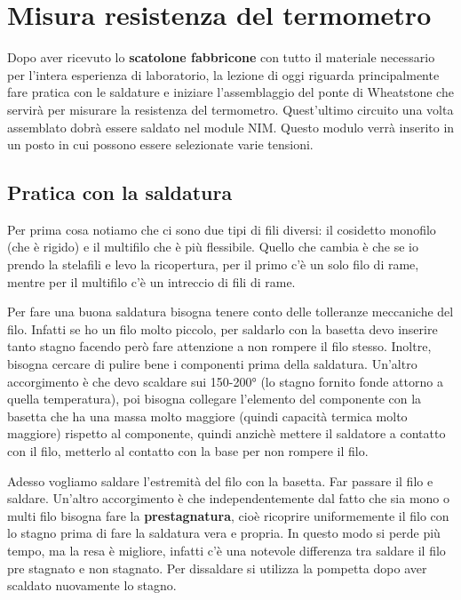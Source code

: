 \documentclass[../main/main.tex]{subfiles}
\begin{document}
\chapter{Misura resistenza del termometro}

Dopo aver ricevuto lo \textbf{scatolone fabbricone} con tutto il materiale necessario per l'intera esperienza di laboratorio, la lezione di oggi riguarda principalmente fare pratica con le saldature e iniziare l'assemblaggio del ponte di Wheatstone che servirà per misurare la resistenza del termometro. Quest'ultimo circuito una volta assemblato dobrà essere saldato nel module NIM. Questo modulo verrà inserito in un posto in cui possono essere selezionate varie tensioni.


\section{Pratica con la saldatura}

Per prima cosa notiamo che ci sono due tipi di fili diversi: il cosidetto monofilo (che è rigido) e il multifilo che è più flessibile. Quello che cambia è che se io prendo la stelafili e levo la ricopertura, per il primo c'è un solo filo di rame, mentre per il multifilo c'è un intreccio di fili di rame.

Per fare una buona saldatura bisogna tenere conto delle tolleranze meccaniche del filo. Infatti se ho un filo molto piccolo, per saldarlo con la basetta devo inserire tanto stagno facendo però fare attenzione a non rompere il filo stesso. Inoltre, bisogna cercare di pulire bene i componenti prima della saldatura.
Un'altro accorgimento è che devo scaldare sui 150-200° (lo stagno fornito fonde attorno a quella temperatura), poi bisogna collegare l'elemento del componente con la basetta che ha una massa molto maggiore (quindi capacità termica molto maggiore) rispetto al componente, quindi anzichè mettere il saldatore a contatto con il filo, metterlo al contatto con la base per non rompere il filo.


Adesso vogliamo saldare l'estremità del filo con la basetta. Far passare il filo e saldare. Un'altro accorgimento è che independentemente dal fatto che sia mono o multi filo bisogna fare la \textbf{prestagnatura}, cioè ricoprire uniformemente il filo con lo stagno prima di fare la saldatura vera e propria. In questo modo si perde più tempo, ma la resa è migliore, infatti c'è una notevole differenza tra saldare il filo pre stagnato e non stagnato.
Per dissaldare si utilizza la pompetta dopo aver scaldato nuovamente lo stagno.
\end{document}
